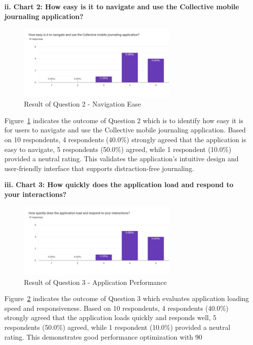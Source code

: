 \textbf{ii. Chart 2: How easy is it to navigate and use the Collective mobile journaling application?}

\begin{figure}[H]
\centering
\includegraphics[width=0.7\textwidth]{files/imgs/survey/chart2_navigation_ease.png}
\caption{Result of Question 2 - Navigation Ease}
\label{fig:chart2-navigation}
\end{figure}

Figure~\ref{fig:chart2-navigation} indicates the outcome of Question 2 which is to identify how easy it is for users to navigate and use the Collective mobile journaling application. Based on 10 respondents, 4 respondents (40.0\%) strongly agreed that the application is easy to navigate, 5 respondents (50.0\%) agreed, while 1 respondent (10.0\%) provided a neutral rating. This validates the application's intuitive design and user-friendly interface that supports distraction-free journaling.

\textbf{iii. Chart 3: How quickly does the application load and respond to your interactions?}

\begin{figure}[H]
\centering
\includegraphics[width=0.7\textwidth]{files/imgs/survey/chart3_performance.png}
\caption{Result of Question 3 - Application Performance}
\label{fig:chart3-performance}
\end{figure}

Figure~\ref{fig:chart3-performance} indicates the outcome of Question 3 which evaluates application loading speed and responsiveness. Based on 10 respondents, 4 respondents (40.0\%) strongly agreed that the application loads quickly and responds well, 5 respondents (50.0\%) agreed, while 1 respondent (10.0\%) provided a neutral rating. This demonstrates good performance optimization with 90%


